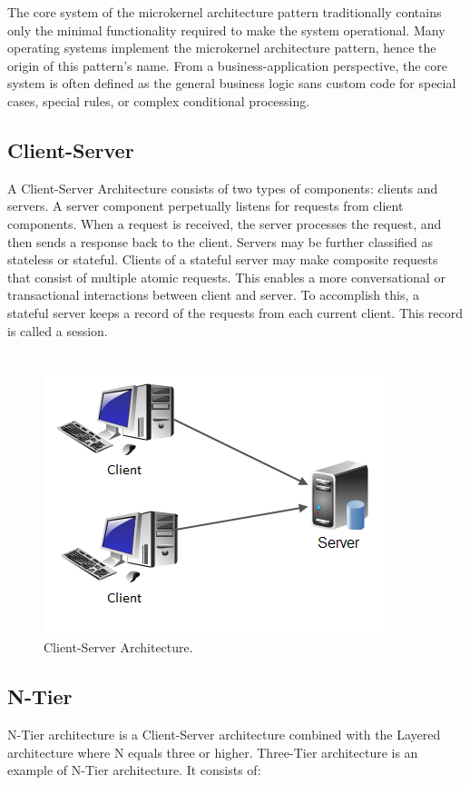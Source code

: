 \documentclass{article}
\begin{document}
\noindent The core system of the microkernel architecture pattern traditionally contains only the minimal functionality required to make the system operational. Many operating systems implement the microkernel architecture pattern, hence the origin of this pattern's name. From a business-application perspective, the core system is often defined as the general business logic sans custom code for special cases, special rules, or complex conditional processing.
\newpage


\subsection{Client-Server}
A Client-Server Architecture consists of two types of components: clients and servers. A server component perpetually listens for requests from client components. When a request is received, the server processes the request, and then sends a response back to the client. Servers may be further classified as stateless or stateful. Clients of a stateful server may make composite requests that consist of multiple atomic requests. This enables a more conversational or transactional interactions between client and server. To accomplish this, a stateful server keeps a record of the requests from each current client. This record is called a session.\\\\

\begin{figure}[h]
\centering
\includegraphics[scale=1]{cs.png}
\caption{Client-Server Architecture.}
\label{fig_cs}
\end{figure}

\newpage

\subsection{N-Tier}
N-Tier architecture is a Client-Server architecture combined with the Layered architecture where N equals three or higher. Three-Tier architecture is an example of N-Tier architecture. It consists of:
\end{document}
